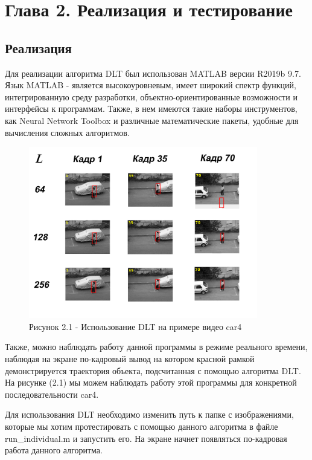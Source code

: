 \section*{Глава 2. Реализация и тестирование}

\setcounter{section}{2}
\setcounter{subsection}{0}

\subsection{Реализация}
 Для реализации алгоритма DLT был использован MATLAB версии R2019b 9.7. Язык MATLAB - является высокоуровневым, имеет широкий спектр функций, интегрированную среду разработки, объектно-ориентированные возможности и интерфейсы к программам. Также, в нем имеются такие наборы инструментов, как Neural Network Toolbox и различные математические пакеты, удобные для вычисления сложных алгоритмов.
 
 \begin{figure}[h]
    \label{car4}
    \centering
    \includegraphics[width=10cm]{tests/img/Bez_imeni-2.jpg}
    \caption*{Рисунок 2.1 - Использование DLT на примере видео car4}
\end{figure}
 
 Также, можно наблюдать работу данной программы в режиме реального времени, наблюдая на экране по-кадровый вывод на котором красной рамкой демонстрируется траектория объекта, подсчитанная с помощью алгоритма DLT. На рисунке (2.1) мы можем наблюдать работу этой программы для конкретной последовательности car4.
 
 Для использования DLT необходимо изменить путь к папке с изображениями, которые мы хотим протестировать с помощью данного алгоритма в файле run\_individual.m и запустить его. На экране начнет появляться по-кадровая работа данного алгоритма. 
 
